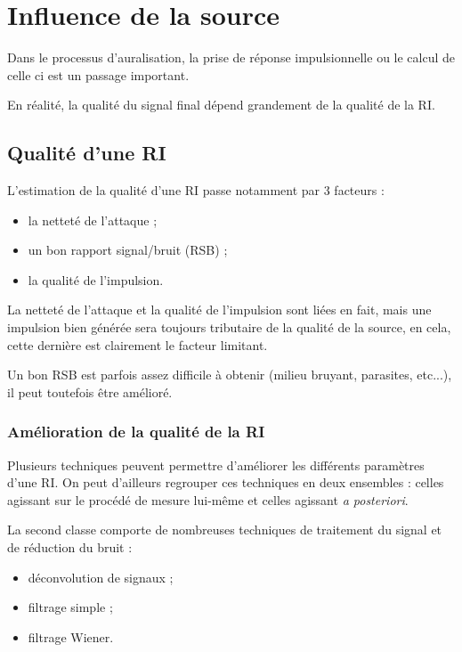 \chapter{Influence de la source}

Dans le processus d'auralisation, la prise de réponse impulsionnelle ou le calcul de celle ci est un passage important.

En réalité, la qualité du signal final dépend grandement de la qualité de la RI.

\section{Qualité d'une RI} %

L'estimation de la qualité d'une RI passe notamment par 3 facteurs :

\begin{itemize}
	\item la netteté de l'attaque ;
	\item un bon rapport signal/bruit (RSB) ; 
	\item la qualité de l'impulsion.
\end{itemize}

La netteté de l'attaque et la qualité de l'impulsion sont liées en fait, mais une impulsion bien générée sera toujours
tributaire de la qualité de la source, en cela, cette dernière est clairement le facteur limitant.

Un bon RSB est parfois assez difficile à obtenir (milieu bruyant, parasites, etc...), il peut toutefois être amélioré.

\subsection{Amélioration de la qualité de la RI} %

Plusieurs techniques peuvent permettre d'améliorer les différents paramètres d'une RI. On peut d'ailleurs regrouper ces
techniques en deux ensembles : celles agissant sur le procédé de mesure lui-même et celles agissant \textit{a
posteriori}. 

La second classe comporte de nombreuses techniques de traitement du signal et de réduction du bruit :

\begin{itemize}
    \item déconvolution de signaux ;
    \item filtrage simple ;
    \item filtrage Wiener.
\end{itemize}

